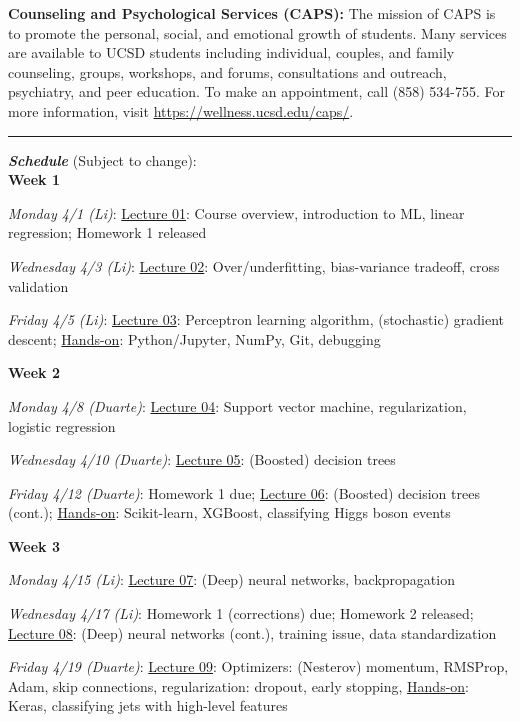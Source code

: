 \documentclass[12pt]{article}
\begin{document}
\noindent\textbf{Counseling and Psychological Services (CAPS):} The mission of CAPS is to promote the personal, social, and emotional growth of students.
Many services are available to UCSD students including individual, couples, and family counseling, groups, workshops, and forums, consultations and outreach, psychiatry, and peer education.
To make an appointment, call (858) 534-755.
For more information, visit \href{https://wellness.ucsd.edu/caps/}{https://wellness.ucsd.edu/caps/}.

\begin{center}
	\rule{\textwidth}{0.5pt}
\end{center}

\noindent\textbf{\emph{Schedule}} (Subject to change):\\

\noindent\textbf{Week 1}

\emph{Monday 4/1 (Li)}: \underline{Lecture 01}: Course overview, introduction to ML, linear regression; Homework 1 released

\emph{Wednesday 4/3 (Li)}: \underline{Lecture 02}: Over/underfitting, bias-variance tradeoff, cross validation

\emph{Friday 4/5 (Li)}: \underline{Lecture 03}: Perceptron learning algorithm, (stochastic) gradient descent; \underline{Hands-on}: Python/Jupyter, NumPy, Git, debugging

\noindent\textbf{Week 2}

\emph{Monday 4/8 (Duarte)}: \underline{Lecture 04}: Support vector machine, regularization, logistic regression

\emph{Wednesday 4/10 (Duarte)}: \underline{Lecture 05}: (Boosted) decision trees

\emph{Friday 4/12 (Duarte)}: Homework 1 due; \underline{Lecture 06}: (Boosted) decision trees (cont.); \underline{Hands-on}: Scikit-learn, XGBoost, classifying Higgs boson events

\noindent\textbf{Week 3}

\emph{Monday 4/15 (Li)}: \underline{Lecture 07}: (Deep) neural networks, backpropagation

\emph{Wednesday 4/17 (Li)}: Homework 1 (corrections) due; Homework 2 released; \underline{Lecture 08}: (Deep) neural networks (cont.), training issue, data standardization

\emph{Friday 4/19 (Duarte)}: \underline{Lecture 09}: Optimizers: (Nesterov) momentum, RMSProp, Adam, skip connections, regularization: dropout, early stopping, \underline{Hands-on}: Keras, classifying jets with high-level features
\end{document}
